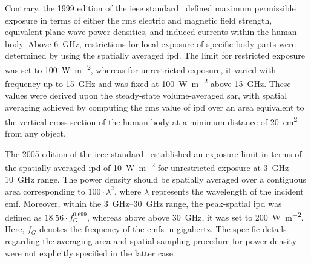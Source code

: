 Contrary, the 1999 edition of the \gls{ieee} standard~\cite{IEEE1999Standard} defined maximum permissible exposure in terms of either the \gls{rms} electric and magnetic field strength, equivalent plane-wave power densities, and induced currents within the human body.
Above \SI{6}{\GHz}, restrictions for local exposure of specific body parts were determined by using the spatially averaged \gls{ipd}.
The limit for restricted exposure was set to \SI{100}{\watt\per\meter\squared}, whereas for unrestricted exposure, it varied with frequency up to \SI{15}{\GHz} and was fixed at \SI{100}{\watt\per\meter\squared} above \SI{15}{\GHz}.
These values were derived upon the steady-state volume-averaged \gls{sar}, with spatial averaging achieved by computing the \gls{rms} value of \gls{ipd} over an area equivalent to the vertical cross section of the human body at a minimum distance of \SI{20}{\cm\squared} from any object.

The 2005 edition of the \gls{ieee} standard~\cite{IEEE2005Standard} established an exposure limit in terms of the spatially averaged \gls{ipd} of \SI{10}{\watt\per\meter\squared} for unrestricted exposure at \SIrange{3}{10}{\GHz} range.
The power density should be spatially averaged over a contiguous area corresponding to $100 \cdot \lambda^2$, where $\lambda$ represents the wavelength of the incident \gls{emf}.
Moreover, within the \SIrange{3}{30}{\GHz} range, the peak-spatial \gls{ipd} was defined as $18.56 \cdot f_G^{0.699}$, whereas above above \SI{30}{\GHz}, it was set to \SI{200}{\watt\per\m\squared}.
Here, $f_G$ denotes the frequency of the \gls{emf}s in gigahertz.
The specific details regarding the averaging area and spatial sampling procedure for power density were not explicitly specified in the latter case.



